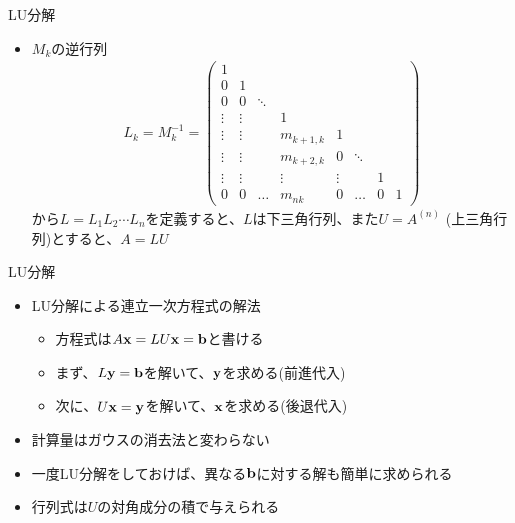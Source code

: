 \begin{frame}[t,fragile]{LU分解}
  \begin{itemize}
    \setlength{\itemsep}{1em}
  \item $M_k$の逆行列
    \begin{align*}
      L_k = M_k^{-1} = 
      \begin{pmatrix}
        1 & \\
        0 & 1 \\
        0 & 0 & \ddots \\
        \vdots & \vdots & & 1 \\
        \vdots & \vdots & & m_{k+1,k} & 1 & \\
        \vdots & \vdots & & m_{k+2,k} & 0 & \ddots \\
        \vdots & \vdots & & \vdots & \vdots & & 1 & \\
        0 & 0 & \hdots & m_{nk} & 0 & \hdots & 0 & 1
      \end{pmatrix}
    \end{align*}
    から$L=L_1L_2\cdots L_n$を定義すると、$L$は下三角行列、また$U = A^{(n)}$ (上三角行列)とすると、$A = LU$
  \end{itemize}
\end{frame}

\begin{frame}[t,fragile]{LU分解}
  \begin{itemize}
    \setlength{\itemsep}{1em}
  \item LU分解による連立一次方程式の解法
    \begin{itemize}
    \item 方程式は$A{\bf x} = LU{\bf x} = {\bf b}$と書ける
    \item まず、$L{\bf y} = {\bf b}$を解いて、${\bf y}$を求める(前進代入)
    \item 次に、$U{\bf x} = {\bf y}$を解いて、${\bf x}$を求める(後退代入)
    \end{itemize}
  \item 計算量はガウスの消去法と変わらない
  \item 一度LU分解をしておけば、異なる${\bf b}$に対する解も簡単に求められる
  \item 行列式は$U$の対角成分の積で与えられる
  \end{itemize}
\end{frame}
